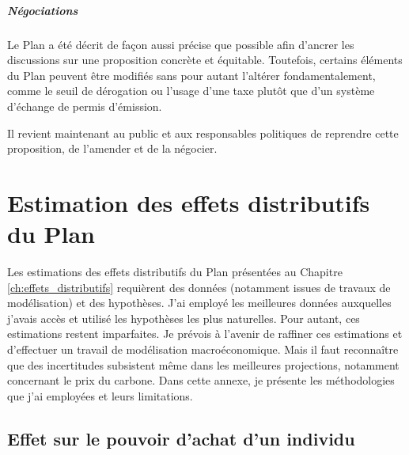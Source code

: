 \documentclass[a5paper,french,openany]{memoir}
\begin{document}
\paragraph{Négociations}

Le Plan a été décrit de façon aussi précise que possible afin d'ancrer les discussions sur une proposition concrète et équitable. Toutefois, certains éléments du Plan peuvent être modifiés sans pour autant l'altérer fondamentalement, comme le seuil de dérogation ou l'usage d'une taxe plutôt que d'un système d'échange de permis d'émission. 

Il revient maintenant au public et aux responsables politiques de reprendre cette proposition, de l'amender et de la négocier.



\chapter{Estimation des effets distributifs du Plan
}\label{ch:methodo}

Les estimations des effets distributifs du Plan présentées au Chapitre \ref{ch:effets_distributifs} requièrent des données (notamment issues de travaux de modélisation) et des hypothèses. 
J'ai employé les meilleures données auxquelles j'avais accès et utilisé les hypothèses les plus naturelles. Pour autant, ces estimations restent imparfaites. Je prévois à l'avenir de raffiner ces estimations et d'effectuer un travail de modélisation macroéconomique. Mais il faut reconnaître que des incertitudes subsistent même dans les meilleures projections, notamment concernant le prix du carbone. 
Dans cette annexe, je présente les méthodologies que j'ai employées et leurs limitations.

\section{Effet sur le pouvoir d'achat d'un individu}\label{app:indiv}
\end{document}
